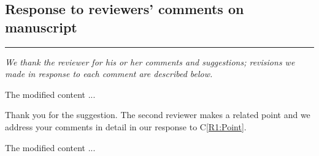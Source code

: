 \documentclass[12pt]{article}
\begin{document}
\begin{center}
	\section*{\Huge \textcolor{capcolor}{Response to reviewers’ comments on manuscript}	}
\end{center}

\hrule



%
%
%

\hspace{2cm}



\reviewersection

\textit{We thank the reviewer for his or her comments and suggestions;
revisions we made in response to each comment are described below.}

\begin{comment}
	\lipsum[2]
	\label{R1:Point}
\end{comment}

\begin{response}
	\lipsum[3]
\end{response}

\begin{recompose}
	The modified content ...
\end{recompose}  

\begin{comment}
	\lipsum[11]
\end{comment}

\begin{response}
Thank you for the suggestion. The second reviewer makes a related point and we address your comments in detail in our response to C\ref{R1:Point}.
\end{response}

\begin{recompose}
	The modified content ...
\end{recompose} 

\clearpage

\reviewersection
\end{document}
